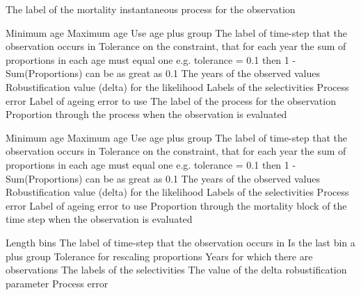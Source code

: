  {The label of the mortality instantaneous process for the observation}
\par\textbf{}\par
{} {Minimum age}
 {Maximum age}
 {Use age plus group}
 {The label of time-step that the observation occurs in}
 {Tolerance on the constraint, that for each year the sum of proportions in each age must equal one e.g. tolerance = 0.1 then 1 - Sum(Proportions) can be as great as 0.1}
 {The years of the observed values}
 {Robustification value (delta) for the likelihood}
 {Labels of the selectivities}
 {Process error}
 {Label of ageing error to use}
 {The label of the process for the observation}
 {Proportion through the process when the observation is evaluated}
\par\textbf{}\par
{} {Minimum age}
 {Maximum age}
 {Use age plus group}
 {The label of time-step that the observation occurs in}
 {Tolerance on the constraint, that for each year the sum of proportions in each age must equal one e.g. tolerance = 0.1 then 1 - Sum(Proportions) can be as great as 0.1}
 {The years of the observed values}
 {Robustification value (delta) for the likelihood}
 {Labels of the selectivities}
 {Process error}
 {Label of ageing error to use}
 {Proportion through the mortality block of the time step when the observation is evaluated}
\par\textbf{}\par
{} {Length bins}
 {The label of time-step that the observation occurs in}
 {Is the last bin a plus group}
 {Tolerance for rescaling proportions}
 {Years for which there are observations}
 {The labels of the selectivities}
 {The value of the delta robustification parameter}
 {Process error}
